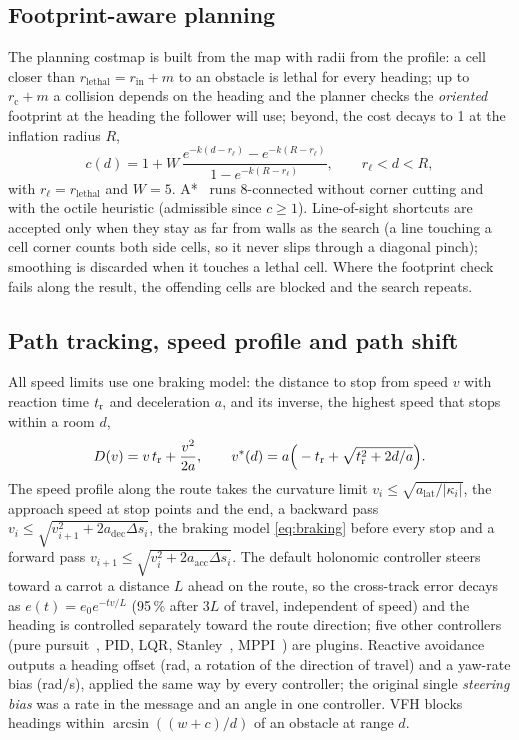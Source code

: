 \subsection{Footprint-aware planning}
\label{sec:plan}

The planning costmap is built from the map with radii from the profile: a cell closer than
$r_{\mathrm{lethal}} = r_{\mathrm{in}} + m$ to an obstacle is lethal for every heading; up to
$r_{\mathrm{c}} + m$ a collision depends on the heading and the planner checks the
\emph{oriented} footprint at the heading the follower will use; beyond, the cost decays to 1 at
the inflation radius $R$,
\begin{equation}
  c(d) = 1 + W\, \frac{e^{-k(d - r_{\ell})} - e^{-k(R - r_{\ell})}}
  {1 - e^{-k(R - r_{\ell})}}, \qquad r_{\ell} < d < R,
\end{equation}
with $r_\ell = r_{\mathrm{lethal}}$ and $W = 5$. A*~\cite{hart1968astar} runs 8-connected without corner cutting and with the
octile heuristic (admissible since $c \ge 1$). Line-of-sight shortcuts are accepted only when
they stay as far from walls as the search (a line touching a cell corner counts both side
cells, so it never slips through a diagonal pinch); smoothing is discarded when it touches a
lethal cell. Where the footprint check fails along the result, the offending cells are blocked
and the search repeats.

\subsection{Path tracking, speed profile and path shift}
\label{sec:track}

All speed limits use one braking model: the distance to stop from speed $v$ with reaction time
$t_{\mathrm{r}}$ and deceleration $a$, and its inverse, the highest speed that stops within a room $d$,
\begin{equation}
  D(v) = v\,t_{\mathrm{r}} + \frac{v^2}{2a}, \qquad
  v^*(d) = a\Big(-t_{\mathrm{r}} + \sqrt{t_{\mathrm{r}}^2 + 2d/a}\Big).
  \label{eq:braking}
\end{equation}
The speed profile along the route takes the curvature limit $v_i \le \sqrt{a_{\mathrm{lat}}
/|\kappa_i|}$, the approach speed at stop points and the end, a backward pass
$v_i \le \sqrt{v_{i+1}^2 + 2 a_{\mathrm{dec}} \Delta s_i}$, the braking model \eqref{eq:braking}
before every stop and a forward pass $v_{i+1} \le \sqrt{v_i^2 + 2 a_{\mathrm{acc}} \Delta s_i}$.
The default holonomic controller steers toward a carrot a distance $L$ ahead on the route, so
the cross-track error decays as $e(t) = e_0 e^{-t v/L}$ (95\,\% after $3L$ of travel,
independent of speed) and the heading is controlled separately toward the route direction; five
other controllers (pure pursuit~\cite{coulter1992purepursuit}, PID, LQR,
Stanley~\cite{thrun2006stanley}, MPPI~\cite{williams2017mppi}) are plugins. Reactive avoidance
outputs a heading offset (rad, a rotation of the direction of travel) and a yaw-rate bias
(rad/s), applied the same way by every controller; the original single \emph{steering bias}
was a rate in the message and an angle in one controller. VFH blocks headings within
$\arcsin((w + c)/d)$ of an obstacle at range $d$.

